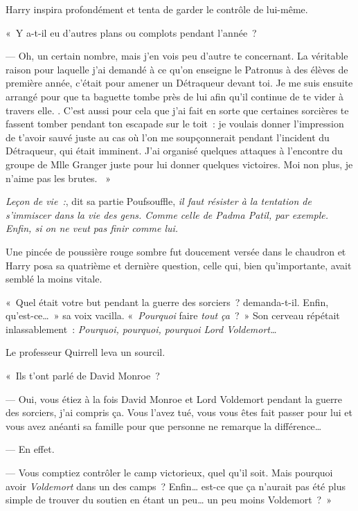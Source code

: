 Harry inspira profondément et tenta de garder le contrôle de lui-même.

«~Y a-t-il eu d'autres plans ou complots pendant l'année~?

--- Oh, un certain nombre, mais j'en vois peu d'autre te concernant.
La véritable raison pour laquelle j'ai demandé à ce qu'on enseigne le Patronus à des élèves de première année, c'était pour amener un Détraqueur devant toi.
Je me suis ensuite arrangé pour que ta baguette tombe près de lui afin qu'il continue de te vider à travers elle.
.
C'est aussi pour cela que j'ai fait en sorte que certaines sorcières te fassent tomber pendant ton escapade sur le toit~: je voulais donner l'impression de t'avoir sauvé juste au cas où l'on me soupçonnerait pendant l'incident du Détraqueur, qui était imminent.
 J'ai organisé quelques attaques à l'encontre du groupe de Mlle Granger juste pour lui donner quelques victoires.
Moi non plus, je n'aime pas les brutes.
~»

\emph{Leçon de vie~:}, dit sa partie Poufsouffle, \emph{il faut résister à la tentation de s'immiscer dans la vie des gens.
Comme celle de Padma Patil, par exemple.
Enfin, si on ne veut pas finir comme lui.}

Une pincée de poussière rouge sombre fut doucement versée dans le chaudron et Harry posa sa quatrième et dernière question, celle qui, bien qu'importante, avait semblé la moins vitale.

«~Quel était votre but pendant la guerre des sorciers~? demanda-t-il.
Enfin, qu'est-ce…~»
sa voix vacilla.
«~\emph{Pourquoi} faire \emph{tout ça}~?~»
Son cerveau répétait inlassablement~: \emph{Pourquoi, pourquoi, pourquoi Lord Voldemort…}

Le professeur Quirrell leva un sourcil.

«~Ils t'ont parlé de David Monroe~?

--- Oui, vous étiez à la fois David Monroe et Lord Voldemort pendant la guerre des sorciers, j'ai compris ça.
Vous l'avez tué, vous vous êtes fait passer pour lui et vous avez anéanti sa famille pour que personne ne remarque la différence…

--- En effet.

--- Vous comptiez contrôler le camp victorieux, quel qu'il soit.
Mais pourquoi avoir \emph{Voldemort} dans un des camps~?
Enfin… est-ce que ça n'aurait pas été plus simple de trouver du soutien en étant un peu… un peu moins Voldemort~?~»

